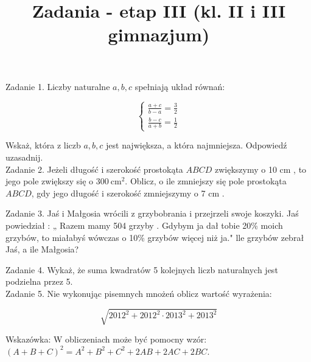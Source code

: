 \documentclass[10pt]{article}
\title{Zadania - etap III (kl. II i III gimnazjum) }
\author{}
\date{}
\begin{document}
\maketitle
Zadanie 1. Liczby naturalne \(a, b, c\) spełniają układ równań:

\[
\left\{\begin{array}{l}
\frac{a+c}{b-a}=\frac{3}{2} \\
\frac{b-c}{a+b}=\frac{1}{2}
\end{array}\right.
\]

Wskaż, która z liczb \(a, b, c\) jest największa, a która najmniejsza. Odpowiedź uzasadnij.\\
Zadanie 2. Jeżeli długość i szerokość prostokąta \(A B C D\) zwiększymy o 10 cm , to jego pole zwiększy się o \(300 \mathrm{~cm}^{2}\). Oblicz, o ile zmniejszy się pole prostokąta \(A B C D\), gdy jego długość i szerokość zmniejszymy o 7 cm .

Zadanie 3. Jaś i Małgosia wrócili z grzybobrania i przejrzeli swoje koszyki. Jaś powiedział : „ Razem mamy 504 grzyby . Gdybym ja dał tobie 20\% moich grzybów, to miałabyś wówczas o 10\% grzybów więcej niż ja." lle grzybów zebrał Jaś, a ile Małgosia?

Zadanie 4. Wykaż, że suma kwadratów 5 kolejnych liczb naturalnych jest podzielna przez 5.\\
Zadanie 5. Nie wykonując pisemnych mnożeń oblicz wartość wyrażenia:

\[
\sqrt{2012^{2}+2012^{2} \cdot 2013^{2}+2013^{2}}
\]

Wskazówka: W obliczeniach może być pomocny wzór:\\
\((A+B+C)^{2}=A^{2}+B^{2}+C^{2}+2 A B+2 A C+2 B C\).
\end{document}
